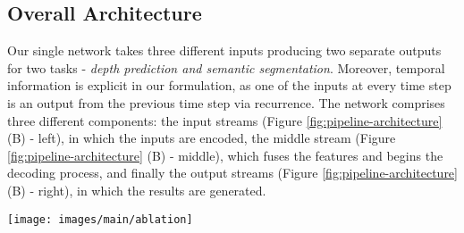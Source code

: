 \documentclass[10pt,twocolumn,letterpaper]{article}
\begin{document}
\subsection{Overall Architecture}
\label{ssec:architecture_approach}\vspace{-0.1cm}

Our single network takes three different inputs producing two separate outputs for two tasks - \textit{depth prediction and semantic segmentation}. Moreover, temporal information is explicit in our formulation, as one of the inputs at every time step is an output from the previous time step via recurrence. The network comprises three different components: the input streams (Figure \ref{fig:pipeline-architecture} (B) - left), in which the inputs are encoded, the middle stream (Figure \ref{fig:pipeline-architecture} (B) - middle), which fuses the features and begins the decoding process, and finally the output streams (Figure \ref{fig:pipeline-architecture} (B) - right), in which the results are generated.\begin{figure*}[t!]
	\centering
	\texttt{[image: images/main/ablation]}
	\captionsetup[figure]{skip=7pt}
	\label{fig:ablation}\vspace{-0.3cm}
\end{figure*}
\end{document}
